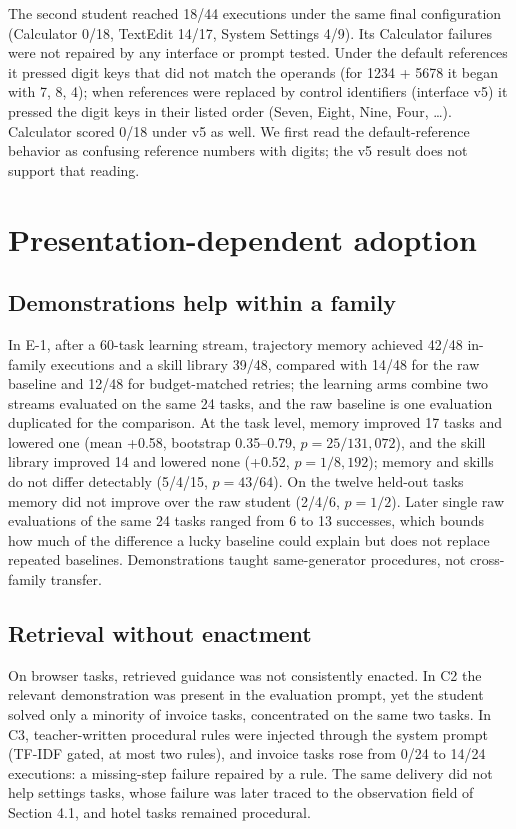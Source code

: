 \documentclass[
  10pt,
]{article}
\newcounter{none} %
\begin{document}
The second student reached 18/44 executions under the same final
configuration (Calculator 0/18, TextEdit 14/17, System Settings 4/9).
Its Calculator failures were not repaired by any interface or prompt
tested. Under the default references it pressed digit keys that did not
match the operands (for 1234 + 5678 it began with 7, 8, 4); when
references were replaced by control identifiers (interface v5) it
pressed the digit keys in their listed order (Seven, Eight, Nine, Four,
\ldots). Calculator scored 0/18 under v5 as well. We first read the
default-reference behavior as confusing reference numbers with digits;
the v5 result does not support that reading.

\section{Presentation-dependent
adoption}\label{presentation-dependent-adoption}

\subsection{Demonstrations help within a
family}\label{demonstrations-help-within-a-family}

In E-1, after a 60-task learning stream, trajectory memory achieved
42/48 in-family executions and a skill library 39/48, compared with
14/48 for the raw baseline and 12/48 for budget-matched retries; the
learning arms combine two streams evaluated on the same 24 tasks, and
the raw baseline is one evaluation duplicated for the comparison. At the
task level, memory improved 17 tasks and lowered one (mean +0.58,
bootstrap 0.35--0.79, \(p=25/131{,}072\)), and the skill library
improved 14 and lowered none (+0.52, \(p=1/8{,}192\)); memory and skills
do not differ detectably (5/4/15, \(p=43/64\)). On the twelve held-out
tasks memory did not improve over the raw student (2/4/6, \(p=1/2\)).
Later single raw evaluations of the same 24 tasks ranged from 6 to 13
successes, which bounds how much of the difference a lucky baseline
could explain but does not replace repeated baselines. Demonstrations
taught same-generator procedures, not cross-family transfer.

\subsection{Retrieval without
enactment}\label{retrieval-without-enactment}

On browser tasks, retrieved guidance was not consistently enacted. In C2
the relevant demonstration was present in the evaluation prompt, yet the
student solved only a minority of invoice tasks, concentrated on the
same two tasks. In C3, teacher-written procedural rules were injected
through the system prompt (TF-IDF gated, at most two rules), and invoice
tasks rose from 0/24 to 14/24 executions: a missing-step failure
repaired by a rule. The same delivery did not help settings tasks, whose
failure was later traced to the observation field of Section 4.1, and
hotel tasks remained procedural.
\end{document}
